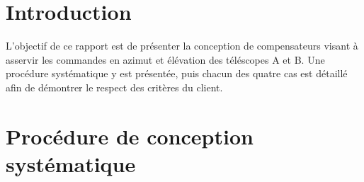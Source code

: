 \documentclass{udes_rapport} %
\begin{document}




\newpage

\tableofcontents
\newpage


\listoffigures
\newpage

\listoftables
\newpage



\setcounter{page}{1} %
\section{Introduction}
L'objectif de ce rapport est de présenter la conception de compensateurs visant à asservir les commandes en azimut et élévation des téléscopes A et B. Une procédure systématique y est présentée, puis chacun des quatre cas est détaillé afin de démontrer le respect des critères du client.
\section{Procédure de conception systématique}
\end{document}
